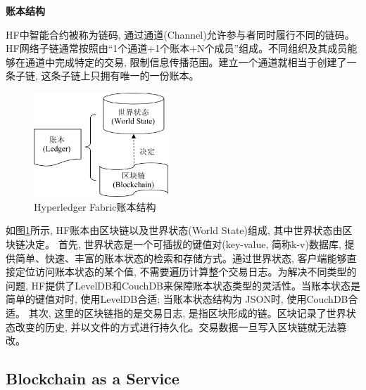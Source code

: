 \textbf{账本结构}

HF中智能合约被称为链码, 通过通道(Channel)允许参与者同时履行不同的链码。HF网络子链通常按照由“1个通道+1个账本+N个成员”组成。不同组织及其成员能够在通道中完成特定的交易, 限制信息传播范围。建立一个通道就相当于创建了一条子链, 这条子链上只拥有唯一的一份账本。

\begin{figure}[h] %
    \centering %
    \includegraphics[width=0.45\textwidth]{FIGs/chapter2/ledger.pdf} %
    \caption{Hyperledger Fabric账本结构} %
    \label{fabric_ledger} %
\end{figure}%

如图\ref{fabric_ledger}所示, HF账本由区块链以及世界状态(World State)组成, 其中世界状态由区块链决定。
首先, 世界状态是一个可插拔的键值对(key-value, 简称k-v)数据库, 提供简单、快速、丰富的账本状态的检索和存储方式。通过世界状态, 客户端能够直接定位访问账本状态的某个值, 不需要遍历计算整个交易日志。为解决不同类型的问题, HF提供了LevelDB和CouchDB来保障账本状态类型的灵活性。当账本状态是简单的键值对时, 使用LevelDB合适; 当账本状态结构为 JSON时, 使用CouchDB合适。
其次, 这里的区块链指的是交易日志, 是指区块形成的链。区块记录了世界状态改变的历史, 并以文件的方式进行持久化。交易数据一旦写入区块链就无法篡改。

\subsection{Blockchain as a Service}\label{section: BaaS}

